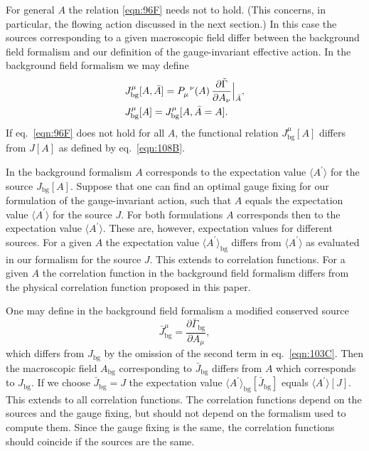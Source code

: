 \documentclass[twocolumn,aps,prd,amsmath,amssymb,preprintnumbers,longbibliography]{revtex4-1}
\numberwithin{equation}{section}
\newenvironment{alignedeqn}{\begin{equation}\begin{aligned}}{\end{aligned}\end{equation}\ignorespacesafterend}
\begin{document}
For general $A$ the relation \eqref{eqn:96F} needs not to hold. (This concerns, in particular, the flowing action discussed in the next section.) In this case the sources corresponding to a given macroscopic field differ between the background field formalism and our definition of the gauge-invariant effective action. In the background field formalism we may define
\begin{alignedeqn}\label{eqn:106A}
	&J_\text{bg}^\mu[A,\bar{A}]
	= \tensor{P}{_\mu^\nu}(A) \, \frac{\partial \tilde\Gamma}{\partial A_\nu}\Bigr|_{\bar{A}},\\
	&J_\text{bg}^\mu[A]
	= J_\text{bg}^\mu[A,\bar{A} = A].
\end{alignedeqn}
If eq.~\eqref{eqn:96F} does not hold for all $A$, the functional relation $J_\text{bg}^\mu[A]$ differs from $J[A]$ as defined by eq.~\eqref{eqn:108B}.

In the background formalism $A$ corresponds to the expectation value $\langle A^\prime\rangle$ for the source $J_\text{bg}[A]$. Suppose that one can find an optimal gauge fixing for our formulation of the gauge-invariant action, such that $A$ equals the expectation value $\langle A^\prime\rangle$ for the source $J$. For both formulations $A$ corresponds then to the expectation value $\langle A^\prime\rangle$. These are, however, expectation values for different sources. For a given $A$ the expectation value $\langle A^\prime\rangle_\text{bg}$ differs from $\langle A^\prime\rangle$ as evaluated in our formalism for the source $J$. This extends to correlation functions. For a given $A$ the correlation function in the background field formalism differs from the physical correlation function proposed in this paper.

One may define in the background field formalism a modified conserved source
\begin{equation}
	\bar{J}_\text{bg}^\mu
	= \frac{\partial \bar\Gamma_\text{bg}}{\partial A_\mu},
\end{equation}
which differs from $J_\text{bg}$ by the omission of the second term in eq.~\eqref{eqn:103C}. Then the macroscopic field $A_\text{bg}$ corresponding to $\bar{J}_\text{bg}$ differs from $A$ which corresponds to $J_\text{bg}$. If we choose $\bar{J}_\text{bg} = J$ the expectation value $\langle A^\prime\rangle_\text{bg}[\bar{J}_\text{bg}]$ equals $\langle A^\prime\rangle[J]$. This extends to all correlation functions. The correlation functions depend on the sources and the gauge fixing, but should not depend on the formalism used to compute them. Since the gauge fixing is the same, the correlation functions should coincide if the sources are the same.
\end{document}
